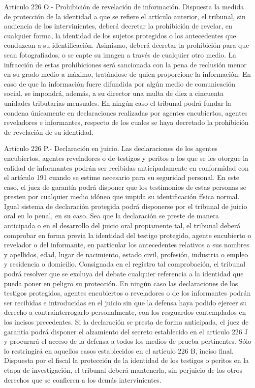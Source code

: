     Artículo 226 O.- Prohibición de revelación de información. Dispuesta la medida de protección de la identidad a que se refiere el artículo anterior, el tribunal, sin audiencia de los intervinientes, deberá decretar la prohibición de revelar, en cualquier forma, la identidad de los sujetos protegidos o los antecedentes que conduzcan a su identificación. Asimismo, deberá decretar la prohibición para que sean fotografiados, o se capte su imagen a través de cualquier otro medio.
    La infracción de estas prohibiciones será sancionada con la pena de reclusión menor en su grado medio a máximo, tratándose de quien proporcione la información. En caso de que la información fuere difundida por algún medio de comunicación social, se impondrá, además, a su director una multa de diez a cincuenta unidades tributarias mensuales.
    En ningún caso el tribunal podrá fundar la condena únicamente en declaraciones realizadas por agentes encubiertos, agentes reveladores e informantes, respecto de los cuales se haya decretado la prohibición de revelación de su identidad.

    Artículo 226 P.- Declaración en juicio. Las declaraciones de los agentes encubiertos, agentes reveladores o de testigos y peritos a los que se les otorgue la calidad de informantes podrán ser recibidas anticipadamente en conformidad con el artículo 191 cuando se estime necesario para su seguridad personal. En este caso, el juez de garantía podrá disponer que los testimonios de estas personas se presten por cualquier medio idóneo que impida su identificación física normal. Igual sistema de declaración protegida podrá disponerse por el tribunal de juicio oral en lo penal, en su caso.
    Sea que la declaración se preste de manera anticipada o en el desarrollo del juicio oral propiamente tal, el tribunal deberá comprobar en forma previa la identidad del testigo protegido, agente encubierto o revelador o del informante, en particular los antecedentes relativos a sus nombres y apellidos, edad, lugar de nacimiento, estado civil, profesión, industria o empleo y residencia o domicilio. Consignada en el registro tal comprobación, el tribunal podrá resolver que se excluya del debate cualquier referencia a la identidad que pueda poner en peligro su protección.
    En ningún caso las declaraciones de los testigos protegidos, agentes encubiertos o reveladores o de los informantes podrán ser recibidas e introducidas en el juicio sin que la defensa haya podido ejercer su derecho a contrainterrogarlo personalmente, con los resguardos contemplados en los incisos precedentes. Si la declaración se presta de forma anticipada, el juez de garantía podrá disponer el alzamiento del secreto establecido en el artículo 226 J y procurará el acceso de la defensa a todos los medios de prueba pertinentes. Sólo lo restringirá en aquellos casos establecidos en el artículo 226 B, inciso final.
    Dispuesta por el fiscal la protección de la identidad de los testigos o peritos en la etapa de investigación, el tribunal deberá mantenerla, sin perjuicio de los otros derechos que se confieren a los demás intervinientes.

